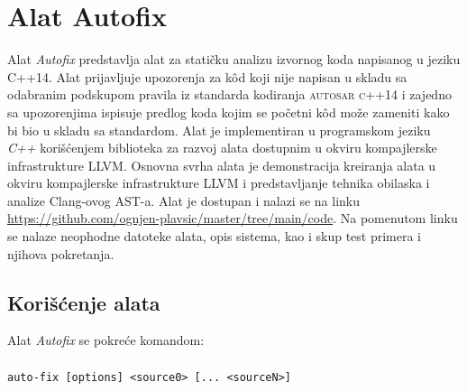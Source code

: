 \documentclass[12pt,oneside]{memoir}
\begin{document}
\chapter{Alat Autofix}
\label{chp:autofix}

Alat \textit{Autofix} predstavlja alat za stati\v{c}ku analizu izvornog koda napisanog u jeziku C++14. Alat prijavljuje upozorenja
za k\^{o}d koji nije napisan u skladu sa odabranim podskupom pravila iz standarda kodiranja \textsc{autosar c++14} i zajedno sa upozorenjima
ispisuje predlog koda kojim se po\v{c}etni k\^{o}d mo\v{z}e zameniti kako bi bio u skladu sa standardom.
Alat je implementiran u programskom jeziku \textit{C++} kori\v{s}\'{c}enjem biblioteka za razvoj alata dostupnim u okviru kompajlerske infrastrukture LLVM.
Osnovna svrha alata je demonstracija kreiranja alata u okviru kompajlerske infrastrukture LLVM i predstavljanje tehnika obilaska i analize Clang-ovog AST-a. 
Alat je dostupan i nalazi se na linku \url{https://github.com/ognjen-plavsic/master/tree/main/code}. Na pomenutom linku se nalaze neophodne datoteke alata, opis
sistema, kao i skup test primera i njihova pokretanja.

\section{Kori\v{s}\'{c}enje alata}

Alat \textit{Autofix} se pokre\'{c}e komandom:
\\ \\
 \indent \indent \texttt{auto-fix [options] <source0> [... <sourceN>]}
\\ 
\end{document}
